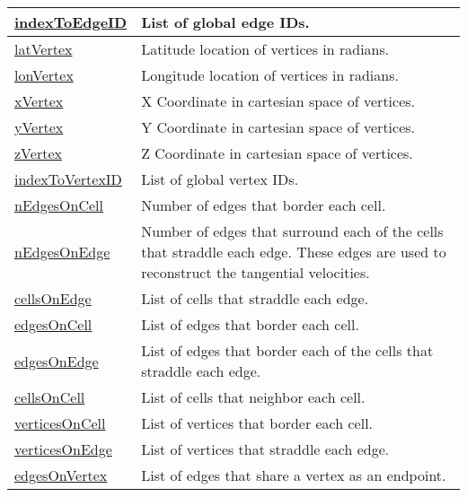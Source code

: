 {\begin{center}
\begin{longtable}{| p{2.0in} | p{4.0in} |}
    \hline
    \hyperref[subsec:var_sec_mesh_indexToEdgeID]{indexToEdgeID} & List of global edge IDs. \\
    \hline
    \hyperref[subsec:var_sec_mesh_latVertex]{latVertex} & Latitude location of vertices in radians. \\
    \hline
    \hyperref[subsec:var_sec_mesh_lonVertex]{lonVertex} & Longitude location of vertices in radians. \\
    \hline
    \hyperref[subsec:var_sec_mesh_xVertex]{xVertex} & X Coordinate in cartesian space of vertices. \\
    \hline
    \hyperref[subsec:var_sec_mesh_yVertex]{yVertex} & Y Coordinate in cartesian space of vertices. \\
    \hline
    \hyperref[subsec:var_sec_mesh_zVertex]{zVertex} & Z Coordinate in cartesian space of vertices. \\
    \hline
    \hyperref[subsec:var_sec_mesh_indexToVertexID]{indexToVertexID} & List of global vertex IDs. \\
    \hline
    \hyperref[subsec:var_sec_mesh_nEdgesOnCell]{nEdgesOnCell} & Number of edges that border each cell. \\
    \hline
    \hyperref[subsec:var_sec_mesh_nEdgesOnEdge]{nEdgesOnEdge} & Number of edges that surround each of the cells that straddle each edge. These edges are used to reconstruct the tangential velocities. \\
    \hline
    \hyperref[subsec:var_sec_mesh_cellsOnEdge]{cellsOnEdge} & List of cells that straddle each edge. \\
    \hline
    \hyperref[subsec:var_sec_mesh_edgesOnCell]{edgesOnCell} & List of edges that border each cell. \\
    \hline
    \hyperref[subsec:var_sec_mesh_edgesOnEdge]{edgesOnEdge} & List of edges that border each of the cells that straddle each edge. \\
    \hline
    \hyperref[subsec:var_sec_mesh_cellsOnCell]{cellsOnCell} & List of cells that neighbor each cell. \\
    \hline
    \hyperref[subsec:var_sec_mesh_verticesOnCell]{verticesOnCell} & List of vertices that border each cell. \\
    \hline
    \hyperref[subsec:var_sec_mesh_verticesOnEdge]{verticesOnEdge} & List of vertices that straddle each edge. \\
    \hline
    \hyperref[subsec:var_sec_mesh_edgesOnVertex]{edgesOnVertex} & List of edges that share a vertex as an endpoint. \\

\end{longtable}
\end{center}}
